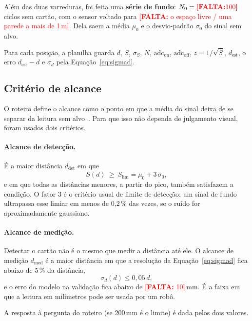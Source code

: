 \documentclass[11pt,a4paper]{article}
\newcommand{\pendente}[1]{\textcolor{red}{\textbf{[FALTA:} #1\textbf{]}}}
\begin{document}
Além das duas varreduras, foi feita uma \textbf{série de fundo}: $N_0 = \pendente{100}$ ciclos sem cartão, com o sensor voltado para \pendente{o espaço livre / uma parede a mais de 1\,m}. Dela saem a média $\mu_0$ e o desvio-padrão $\sigma_0$ do sinal sem alvo.

Para cada posição, a planilha guarda $d$, $\bar{S}$, $\sigma_S$, $N$, $\overline{\text{adc}}_\text{on}$, $\overline{\text{adc}}_\text{off}$, $z = 1/\sqrt{\bar{S}}$, $d_\text{est}$, o erro $d_\text{est} - d$ e $\sigma_d$ pela Equação~\eqref{eq:sigmad}.

\subsection{Critério de alcance}
\label{sec:met-alcance}

O roteiro define o alcance como o ponto em que a média do sinal deixa de se separar da leitura sem alvo~\cite{roteiro}. Para que isso não dependa de julgamento visual, foram usados dois critérios.

\paragraph{Alcance de detecção.} É a maior distância $d_\text{det}$ em que
\begin{equation}
\bar{S}(d) \ \ge\ S_\text{lim} = \mu_0 + 3\,\sigma_0 ,
\label{eq:limiar}
\end{equation}
e em que todas as distâncias menores, a partir do pico, também satisfazem a condição. O fator 3 é o critério usual de limite de detecção: um sinal de fundo ultrapassa esse limiar em menos de 0,2\,\% das vezes, se o ruído for aproximadamente gaussiano.

\paragraph{Alcance de medição.} Detectar o cartão não é o mesmo que medir a distância até ele. O alcance de medição $d_\text{med}$ é a maior distância em que a resolução da Equação~\eqref{eq:sigmad} fica abaixo de 5\,\% da distância,
\begin{equation}
\sigma_d(d) \le 0{,}05\, d ,
\end{equation}
e o erro do modelo na validação fica abaixo de \pendente{10}\,mm. É a faixa em que a leitura em milímetros pode ser usada por um robô.

A resposta à pergunta do roteiro (se 200\,mm é o limite) é dada pelos dois valores.
\end{document}
